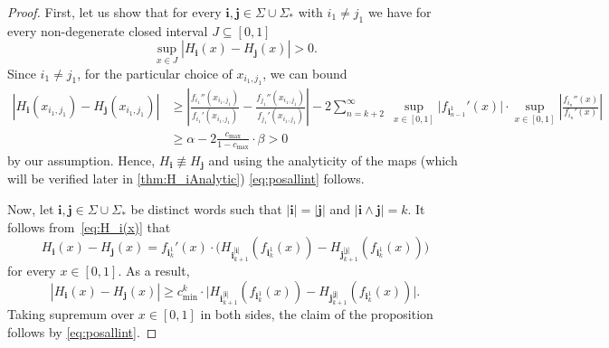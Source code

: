 \documentclass[11pt,]{article}
\def\cref#1{\ref{#1}}%
\theoremstyle{definition}
\theoremstyle{remark}
\newcommand{\0}{\mathbf{0}}
\newcommand{\bi}{\mathbf{i}}
\newcommand{\bj}{\mathbf{j}}
\numberwithin{equation}{section}
\begin{document}
\begin{proof}
First, let us show that for every $\bi,\bj\in\Sigma\cup\Sigma_*$ with $i_1\neq j_1$ we have for every non-degenerate closed interval $J\subseteq[0,1]$
\begin{equation}\label{eq:posallint}
	\sup_{x\in J} |H_{\bi}(x) - H_{\bj}(x)| > 0.
\end{equation} 
Since $i_{1}\neq j_{1}$, for the particular choice of $x_{i_{1},j_{1}}$, we can bound 
\begin{align*}
	|H_{\bi}(x_{i_{1},j_{1}}) - H_{\bj}(x_{i_{1},j_{1}})| 
	&\geq \left| \frac{f_{i_{1}}''(x_{i_{1},j_{1}})}{f_{i_{1}}'(x_{i_{1},j_{1}})} -
	\frac{f_{j_{1}}''(x_{i_{1},j_{1}})}{f_{j_{1}}'(x_{i_{1},j_{1}})} \right| - 2
	\sum_{n=k+2}^{\infty}\; \sup_{x\in[0,1]} \big| f_{\bi_{n-1}^{1}}'(x) \big| \cdot \sup_{x\in[0,1]}
	\left| \frac{f_{i_n}''(x)}{f_{i_n}'(x)} \right| \\
	&\geq \alpha -  2\frac{c_{\max}}{1-c_{\max}}\cdot \beta >0
\end{align*}
by our assumption. Hence, $H_{\bi}\not\equiv H_{\bj}$ and using the analyticity of the maps (which will be verified later in \cref{thm:H_iAnalytic}) \cref{eq:posallint} follows.
	
Now, let $\bi,\bj \in\Sigma\cup\Sigma_*$ be distinct words such that $|\bi|=|\bj|$ and $|\bi\wedge \bj|=k$. It
  follows from~\cref{eq:H_i(x)} that
  \begin{equation*}
    H_{\bi}(x)-H_{\bj}(x) = f_{\bi_k^1}'(x)\cdot \big( H_{\bi_{k+1}^{|\bi|}}(f_{\bi_k^1}(x)) -
    H_{\bj_{k+1}^{|\bj|}}(f_{\bi_k^1}(x)) \big)
\end{equation*}
for every $x\in[0,1]$. As a result,
\begin{equation*}
|H_{\bi}(x)-H_{\bj}(x)| \geq c_{\min}^k\cdot \big| H_{\bi_{k+1}^{|\bi|}}(f_{\bi_k^1}(x)) -
H_{\bj_{k+1}^{|\bj|}}(f_{\bi_k^1}(x)) \big|.
\end{equation*}
Taking supremum over $x\in[0,1]$ in both sides, the claim of the proposition follows by \cref{eq:posallint}.
\end{proof}
\end{document}
